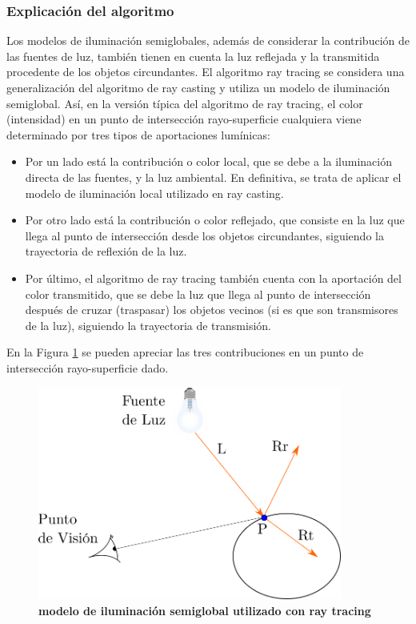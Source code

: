     
\subsubsection{Explicación del algoritmo}

Los modelos de iluminación semiglobales, además de considerar la contribución de las fuentes de luz, también tienen en cuenta la luz reflejada y la transmitida procedente de los objetos circundantes. El algoritmo ray tracing se considera una generalización del algoritmo de ray casting y utiliza un modelo de iluminación semiglobal.
Así, en la versión típica del algoritmo de ray tracing, el color (intensidad) en un punto de intersección rayo-superficie cualquiera viene determinado por tres tipos de aportaciones lumínicas:
\begin{itemize}
    \item Por un lado está la contribución o color local, que se debe a la iluminación directa de las fuentes, y la luz ambiental. En definitiva, se trata de aplicar el modelo de iluminación local utilizado en ray casting.
    \item Por otro lado está la contribución o color reflejado, que consiste en la luz que llega al punto de intersección desde los objetos circundantes, siguiendo la trayectoria de reflexión de la luz.
    \item Por último, el algoritmo de ray tracing también cuenta con la aportación del color transmitido, que se debe la luz que llega al punto de intersección después de cruzar (traspasar) los objetos vecinos (si es que son transmisores de la luz), siguiendo la trayectoria de transmisión. 

\end{itemize}

En la Figura \ref{fig:grafica9} se pueden apreciar las tres contribuciones en un punto de intersección rayo-superficie dado.

\begin{figure}[h]
    \includegraphics[width=10cm]{Img/CPD/grafica9.png}
    \centering
    \caption{\textbf{\footnotesize{ modelo de iluminación semiglobal utilizado con ray tracing  }}}
    \label{fig:grafica9}
\end{figure}

